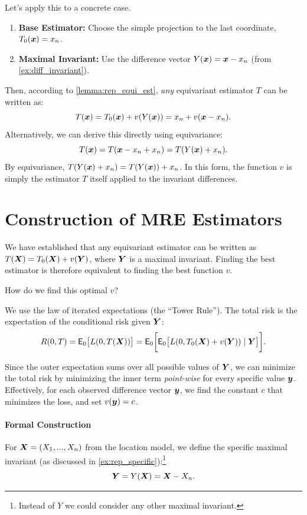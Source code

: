 \begin{ex}
\label{ex:rep_specific}
Let's apply this to a concrete case.
\begin{enumerate}
    \item \textbf{Base Estimator:} Choose the simple projection to the last coordinate, \(T_0(\boldsymbol{x}) = x_n\).
    \item \textbf{Maximal Invariant:} Use the difference vector \(Y(\boldsymbol{x}) = \boldsymbol{x} - x_n\) (from \autoref{ex:diff_invariant}).
\end{enumerate}

Then, according to \autoref{lemma:rep_equi_est}, \textit{any} equivariant estimator \(T\) can be written as:
\[
T(\boldsymbol{x}) = T_0(\boldsymbol{x}) + v(Y(\boldsymbol{x})) = x_n + v(\boldsymbol{x} - x_n).
\]
Alternatively, we can derive this directly using equivariance:
\[
T(\boldsymbol{x}) = T(\boldsymbol{x} - x_n + x_n) = T(Y(\boldsymbol{x}) + x_n).
\]
By equivariance, \(T(Y(\boldsymbol{x}) + x_n) = T(Y(\boldsymbol{x})) + x_n\). In this form, the function \(v\) is simply the estimator \(T\) itself applied to the invariant differences.
\end{ex}

\section{Construction of MRE Estimators}
\label{sec:construction_mre}

We have established that any equivariant estimator can be written as \(T(\boldsymbol{X}) = T_0(\boldsymbol{X}) + v(\boldsymbol{Y})\), where \(\boldsymbol{Y}\) is a maximal invariant. Finding the best estimator is therefore equivalent to finding the best function \(v\).

How do we find this optimal \(v\)? 

We use the law of iterated expectations (the ``Tower Rule''). The total risk is the expectation of the conditional risk given \(\boldsymbol{Y}\):
\[
R(0, T) = \mathsf{E}_0 \big[ L(0, T(\boldsymbol{X})) \big] = \mathsf{E}_0 \bigg[ \mathsf{E}_0 \big[ L(0, T_0(\boldsymbol{X}) + v(\boldsymbol{Y})) \mid \boldsymbol{Y} \big] \bigg].
\]


Since the outer expectation sums over all possible values of \(\boldsymbol{Y}\), we can minimize the total risk by minimizing the inner term \textit{point-wise} for every specific value \(\boldsymbol{y}\). Effectively, for each observed difference vector \(\boldsymbol{y}\), we find the constant \(c\) that minimizes the loss, and set \(v(\boldsymbol{y}) = c\).

\paragraph{Formal Construction}
For \(\boldsymbol{X} = (X_1, ..., X_n)\) from the location model, we define the specific maximal invariant (as discussed in \autoref{ex:rep_specific}):\footnote{Instead of \(Y\) we could consider any other maximal invariant.} 
\[ \boldsymbol{Y} = Y(\boldsymbol{X}) = \boldsymbol{X} - X_n. \]

